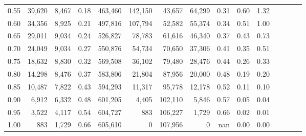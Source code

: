 \begin{tabular}{rrrcrrrrrrrrrrr}
0.55 &  39,620 &  8,467 &                                       0.18 &  463,460 &  142,150 &   43,657 &   64,299 &  0.31 &  0.60 &                         1.32 \\
0.60 &  34,356 &  8,925 &                                       0.21 &  497,816 &  107,794 &   52,582 &   55,374 &  0.34 &  0.51 &                         1.00 \\
0.65 &  29,011 &  9,034 &                                       0.24 &  526,827 &   78,783 &   61,616 &   46,340 &  0.37 &  0.43 &                         0.73 \\
0.70 &  24,049 &  9,034 &                                       0.27 &  550,876 &   54,734 &   70,650 &   37,306 &  0.41 &  0.35 &                         0.51 \\
0.75 &  18,632 &  8,830 &                                       0.32 &  569,508 &   36,102 &   79,480 &   28,476 &  0.44 &  0.26 &                         0.33 \\
0.80 &  14,298 &  8,476 &                                       0.37 &  583,806 &   21,804 &   87,956 &   20,000 &  0.48 &  0.19 &                         0.20 \\
0.85 &  10,487 &  7,822 &                                       0.43 &  594,293 &   11,317 &   95,778 &   12,178 &  0.52 &  0.11 &                         0.10 \\
0.90 &   6,912 &  6,332 &                                       0.48 &  601,205 &    4,405 &  102,110 &    5,846 &  0.57 &  0.05 &                         0.04 \\
0.95 &   3,522 &  4,117 &                                       0.54 &  604,727 &      883 &  106,227 &    1,729 &  0.66 &  0.02 &                         0.01 \\
1.00 &     883 &  1,729 &                                       0.66 &  605,610 &        0 &  107,956 &        0 &   nan &  0.00 &                         0.00 \\
\bottomrule
\end{tabular}
